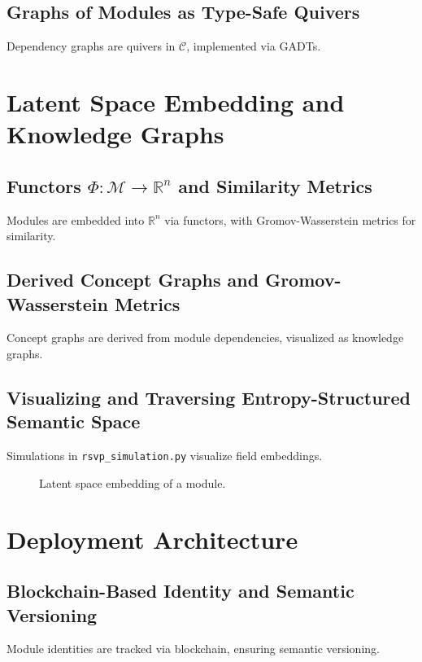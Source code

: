 \documentclass[12pt]{article}
\begin{document}
\subsection{Graphs of Modules as Type-Safe Quivers}
Dependency graphs are quivers in $\mathcal{C}$, implemented via GADTs.

\section{Latent Space Embedding and Knowledge Graphs}
\subsection{Functors $\Phi: \mathcal{M} \to \mathbb{R}^n$ and Similarity Metrics}
Modules are embedded into $\mathbb{R}^n$ via functors, with Gromov-Wasserstein metrics for similarity.

\subsection{Derived Concept Graphs and Gromov-Wasserstein Metrics}
Concept graphs are derived from module dependencies, visualized as knowledge graphs.

\subsection{Visualizing and Traversing Entropy-Structured Semantic Space}
Simulations in \texttt{rsvp\_simulation.py} visualize field embeddings.

\begin{figure}[h]
    \centering
    \caption{Latent space embedding of a module.}
\end{figure}

\section{Deployment Architecture}
\subsection{Blockchain-Based Identity and Semantic Versioning}
Module identities are tracked via blockchain, ensuring semantic versioning.
\end{document}
